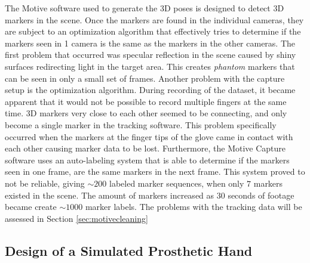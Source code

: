 \documentclass[../main.tex]{subfiles}
\begin{document}
The  Motive software used to generate the 3D poses is designed to detect 3D markers in the scene.
Once the markers are found in the individual cameras, they are subject to an optimization algorithm that effectively tries to determine if the markers seen in 1 camera is the same as the markers in the other cameras.
The first problem that occurred was \gls{specular reflection} in the scene caused by shiny surfaces redirecting light in the target area.
This creates \textit{phantom} markers that can be seen in only a small set of frames.
Another problem with the capture setup is the optimization algorithm.
During recording of the dataset, it became apparent that it would not be possible to record multiple fingers at the same time.
3D markers very close to each other seemed to be connecting, and only become a single marker in the tracking software.
This problem specifically occurred when the markers at the finger tips of the glove came in contact with each other causing marker data to be lost.
Furthermore, the Motive Capture software uses an auto-labeling system that is able to determine if the markers seen in one frame, are the same markers in the next frame.
This system proved to not be reliable, giving $\sim 200$ labeled marker sequences, when only $7$ markers existed in the scene.
The amount of markers increased as 30 seconds of footage became create $\sim 1000$ marker labels.
The problems with the tracking data will be assessed in Section \ref{sec:motivecleaning}

\subsection{Design of a Simulated Prosthetic Hand}
\label{sec:prost_sim}
\end{document}
